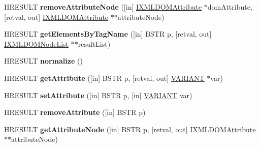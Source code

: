 \begin{DoxyCompactItemize}
H\+R\+E\+S\+U\+LT {\bfseries remove\+Attribute\+Node} (\mbox{[}in\mbox{]} \hyperlink{interface_m_s_x_m_l2_1_1_i_x_m_l_d_o_m_attribute}{I\+X\+M\+L\+D\+O\+M\+Attribute} $\ast$dom\+Attribute, \mbox{[}retval, out\mbox{]} \hyperlink{interface_m_s_x_m_l2_1_1_i_x_m_l_d_o_m_attribute}{I\+X\+M\+L\+D\+O\+M\+Attribute} $\ast$$\ast$attribute\+Node)
\item 
\mbox{\label{interface_m_s_x_m_l2_1_1_i_x_m_l_d_o_m_element_a155c1b6fd760a0e1441932dda5b13c9c}} 
H\+R\+E\+S\+U\+LT {\bfseries get\+Elements\+By\+Tag\+Name} (\mbox{[}in\mbox{]} B\+S\+TR p, \mbox{[}retval, out\mbox{]} \hyperlink{interface_m_s_x_m_l2_1_1_i_x_m_l_d_o_m_node_list}{I\+X\+M\+L\+D\+O\+M\+Node\+List} $\ast$$\ast$result\+List)
\item 
\mbox{\label{interface_m_s_x_m_l2_1_1_i_x_m_l_d_o_m_element_abaa048d73e3b2e6bfa203780b5faf3e6}} 
H\+R\+E\+S\+U\+LT {\bfseries normalize} ()
\item 
\mbox{\label{interface_m_s_x_m_l2_1_1_i_x_m_l_d_o_m_element_a142219db63abe9f5df5a3afdf2ac6cdd}} 
H\+R\+E\+S\+U\+LT {\bfseries get\+Attribute} (\mbox{[}in\mbox{]} B\+S\+TR p, \mbox{[}retval, out\mbox{]} \hyperlink{structtag_v_a_r_i_a_n_t}{V\+A\+R\+I\+A\+NT} $\ast$var)
\item 
\mbox{\label{interface_m_s_x_m_l2_1_1_i_x_m_l_d_o_m_element_ad6258a45fab2c53f69569f0e7194b4c5}} 
H\+R\+E\+S\+U\+LT {\bfseries set\+Attribute} (\mbox{[}in\mbox{]} B\+S\+TR p, \mbox{[}in\mbox{]} \hyperlink{structtag_v_a_r_i_a_n_t}{V\+A\+R\+I\+A\+NT} var)
\item 
\mbox{\label{interface_m_s_x_m_l2_1_1_i_x_m_l_d_o_m_element_ab235c8d8a0ceeae7785d25eb34896b5c}} 
H\+R\+E\+S\+U\+LT {\bfseries remove\+Attribute} (\mbox{[}in\mbox{]} B\+S\+TR p)
\item 
\mbox{\label{interface_m_s_x_m_l2_1_1_i_x_m_l_d_o_m_element_a6654967474f2f49af78325989cabb8f6}} 
H\+R\+E\+S\+U\+LT {\bfseries get\+Attribute\+Node} (\mbox{[}in\mbox{]} B\+S\+TR p, \mbox{[}retval, out\mbox{]} \hyperlink{interface_m_s_x_m_l2_1_1_i_x_m_l_d_o_m_attribute}{I\+X\+M\+L\+D\+O\+M\+Attribute} $\ast$$\ast$attribute\+Node)
$$
\end{DoxyCompactItemize}
